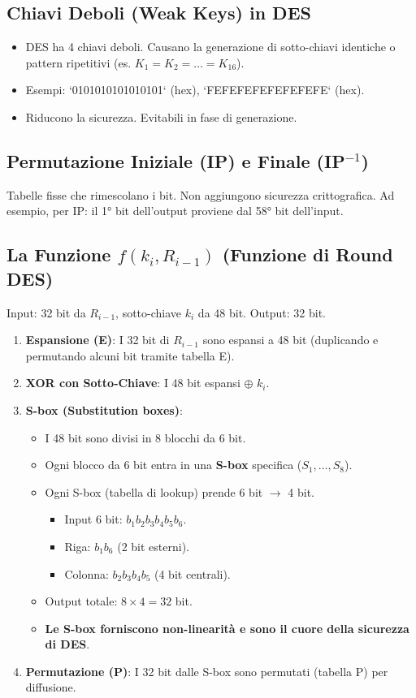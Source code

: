\documentclass{article}
\begin{document}
\subsection{Chiavi Deboli (Weak Keys) in DES}
\begin{itemize}
    \item DES ha 4 chiavi deboli. Causano la generazione di sotto-chiavi identiche o pattern ripetitivi (es. $K_1 = K_2 = \dots = K_{16}$).
    \item Esempi: `0101010101010101` (hex), `FEFEFEFEFEFEFEFE` (hex).
    \item Riducono la sicurezza. Evitabili in fase di generazione.
\end{itemize}

\subsection{Permutazione Iniziale (IP) e Finale (IP$^{-1}$)}
Tabelle fisse che rimescolano i bit. Non aggiungono sicurezza crittografica.
Ad esempio, per IP: il 1° bit dell'output proviene dal 58° bit dell'input.

\subsection{La Funzione $f(k_i, R_{i-1})$ (Funzione di Round DES)}
Input: 32 bit da $R_{i-1}$, sotto-chiave $k_i$ da 48 bit. Output: 32 bit.
\begin{enumerate}
    \item \textbf{Espansione (E)}: I 32 bit di $R_{i-1}$ sono espansi a 48 bit (duplicando e permutando alcuni bit tramite tabella E).
    \item \textbf{XOR con Sotto-Chiave}: I 48 bit espansi $\oplus$ $k_i$.
    \item \textbf{S-box (Substitution boxes)}:
    \begin{itemize}
        \item I 48 bit sono divisi in 8 blocchi da 6 bit.
        \item Ogni blocco da 6 bit entra in una \textbf{S-box} specifica ($S_1, \dots, S_8$).
        \item Ogni S-box (tabella di lookup) prende 6 bit $\rightarrow$ 4 bit.
        \begin{itemize}
            \item Input 6 bit: $b_1 b_2 b_3 b_4 b_5 b_6$.
            \item Riga: $b_1 b_6$ (2 bit esterni).
            \item Colonna: $b_2 b_3 b_4 b_5$ (4 bit centrali).
        \end{itemize}
        \item Output totale: $8 \times 4 = 32$ bit.
        \item \textbf{Le S-box forniscono non-linearità e sono il cuore della sicurezza di DES}.
    \end{itemize}
    \item \textbf{Permutazione (P)}: I 32 bit dalle S-box sono permutati (tabella P) per diffusione.
\end{enumerate}
\end{document}
